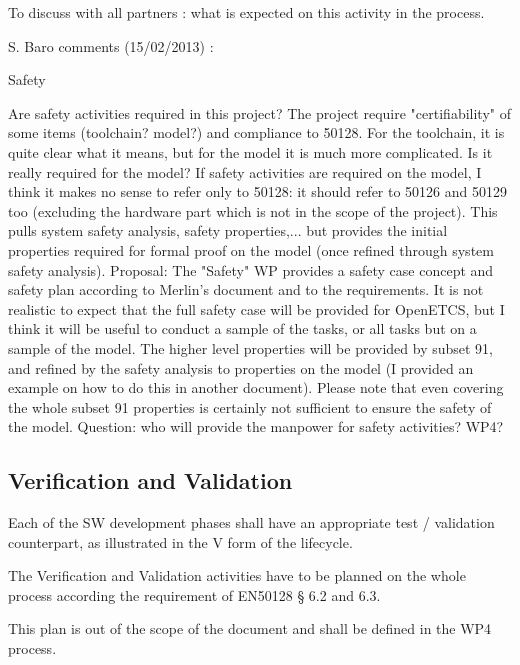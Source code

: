\begin{issue}
To discuss with all partners :  what is expected on this activity in the process.

S. Baro comments (15/02/2013) :

Safety

Are safety activities required in this project? The project require "certifiability" of some items (toolchain? model?) and compliance to 50128. For the toolchain, it is quite clear what it means, but for the model it is much more complicated. Is it really required for the model? If safety activities are required on the model, I think it makes no sense to refer only to 50128: it should refer to 50126 and 50129 too (excluding the hardware part which is not in the scope of the project). This pulls system safety analysis, safety properties,... but provides the initial properties required for formal proof on the model (once refined through system safety analysis).
Proposal: The "Safety" WP provides a safety case concept and safety plan according to Merlin's document and to the requirements. It is not realistic to expect that the full safety case will be provided for OpenETCS, but I think it will be useful to conduct a sample of the tasks, or all tasks but on a sample of the model. The higher level properties will be provided by subset 91, and refined by the safety analysis to properties on the model (I provided an example on how to do this in another document). Please note that even covering the whole subset 91 properties is certainly not sufficient to ensure the safety of the model.
Question: who will provide the manpower for safety activities? WP4? 

\end{issue}


\subsection{Verification and Validation}

Each of the SW development phases shall have an appropriate test / validation
counterpart, as illustrated in the V form of the lifecycle. 


The Verification and Validation activities have to be planned on the whole process according the requirement of EN50128 § 6.2 and 6.3.

This plan is out of the scope of the document and shall be defined in the WP4 process.



